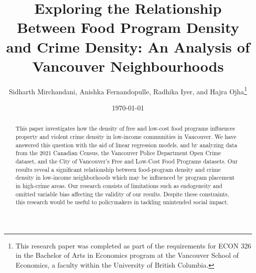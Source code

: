 \documentclass[AEJ]{AEA}
\begin{document}
\title{Exploring the Relationship Between Food Program Density and Crime Density: An Analysis of Vancouver Neighbourhoods}
\author{Sidharth Mirchandani, Anishka Fernandopulle, Radhika Iyer, and Hajra Ojha\thanks{%
This research paper was completed as part of the requirements for ECON 326 in the Bachelor of Arts in Economics program at the Vancouver School of Economics, a faculty within the University of British Columbia.}}
\date{\today}
\JEL{}
\Keywords{}

\begin{abstract}
This paper investigates how the density of free and low-cost food programs influences property and violent crime density in low-income communities in Vancouver. We have answered this question with the aid of linear regression models, and by analyzing data from the 2021 Canadian Census, the Vancouver Police Department Open Crime dataset, and the City of Vancouver's Free and Low-Cost Food Programs datasets. Our results reveal a significant relationship between food-program density and crime density in low-income neighborhoods which may be influenced by program placement in high-crime areas. Our research consists of limitations such as endogeneity and omitted variable bias affecting the validity of our results. Despite these constraints, this research would be useful to policymakers in tackling unintended social impact.
\end{abstract}

\maketitle






\end{document}

